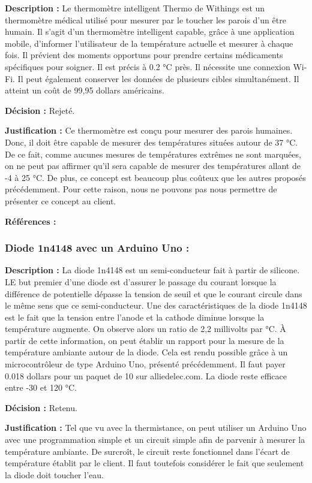 \textbf{Description :} Le thermomètre intelligent Thermo de Withings est un thermomètre médical utilisé pour mesurer par le toucher les parois d’un être humain. Il s’agit d’un thermomètre intelligent capable, grâce à une application mobile, d’informer l’utilisateur de la température actuelle et mesurer à chaque fois. Il prévient des moments opportuns pour prendre certains médicaments spécifiques pour soigner. Il est précis à 0.2 °C près. Il nécessite une connexion Wi-Fi. Il peut également conserver les données de plusieurs cibles simultanément. Il atteint un coût de 99,95 dollars américains.

\textbf{Décision :} Rejeté.

\textbf{Justification :} Ce thermomètre est conçu pour mesurer des parois humaines. Donc, il doit être capable de mesurer des températures situées autour de 37 °C. De ce fait, comme aucunes mesures de températures extrêmes ne sont marquées, on ne peut pas affirmer qu’il sera capable de mesurer des températures allant de -4 à 25 °C. De plus, ce concept est beaucoup plus coûteux que les autres proposés précédemment. Pour cette raison, nous ne pouvons pas nous permettre de présenter ce concept au client. 

\textbf{Références :} \cite{Thermo}

\subsubsection{Diode 1n4148 avec un Arduino Uno : }
\label{1n4}

\textbf{ Description :} La diode 1n4148 est un semi-conducteur fait à partir de silicone. LE but premier d’une diode est d’assurer le passage du courant lorsque la différence de potentielle dépasse la tension de seuil et que le courant circule dans le même sens que ce semi-conducteur. Une des caractéristiques de la diode 1n4148 est le fait que la tension entre l’anode et la cathode diminue lorsque la température augmente. On observe alors un ratio de 2,2 millivolts par °C. À partir de cette information, on peut établir un rapport pour la mesure de la température ambiante autour de la diode. Cela est rendu possible grâce à un microcontrôleur de type Arduino Uno, présenté précédemment. Il faut payer 0.018 dollars pour un paquet de 10 sur alliedelec.com. La diode reste efficace entre -30 et 120 °C.

\textbf{Décision :} Retenu.

\textbf{Justification :} Tel que vu avec la thermistance, on peut utiliser un Arduino Uno avec une programmation simple et un circuit simple afin de parvenir à mesurer la température ambiante. De surcroît, le circuit reste fonctionnel dans l’écart de température établit par le client. Il faut toutefois considérer le fait que seulement la diode doit toucher l'eau.

